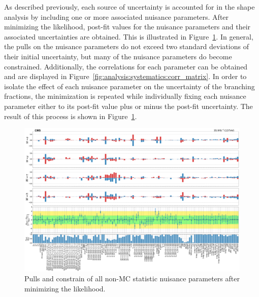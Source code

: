 As described previously, each source of uncertainty is accounted for in
the shape analysis by including one or more associated nuisance
parameters.  After minimizing the likelihood, post-fit values for the
nuisance parameters and their associated uncertainties are obtained.
This is illustrated in Figure~\ref{fig:analysis:systematics:pulls_all}.  In general, the
pulls on the nuisance parameters do not exceed two standard deviations of their
initial uncertainty, but many of the nuisance parameters do become
constrained.  Additionally, the correlations for each parameter can be
obtained and are displayed in Figure~\ref{fig:analysis:systematics:corr_matrix}.  In order to
isolate the effect of each nuisance parameter on the uncertainty of the 
branching fractions, the minimization is repeated while individually fixing each
nuisance parameter either to its post-fit value plus or minus the
post-fit uncertainty.  The result of this process is shown in
Figure~\ref{fig:analysis:systematics:pulls_all}.

\begin{figure}
    \centering
    \includegraphics[width=\textwidth]{chapters/Analysis/sectionSystematics/figures/pulls_impacts_final.pdf}
    \caption{Pulls and constrain of all non-MC statistic nuisance
        parameters after minimizing the likelihood.}
    \label{fig:analysis:systematics:pulls_all}
\end{figure}

